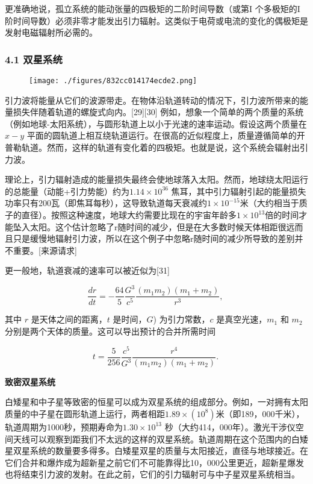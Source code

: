 更准确地说，孤立系统的能动张量的四极矩的二阶时间导数（或第I 个多极矩的I 阶时间导数）必须非零才能发出引力辐射。这类似于电荷或电流的变化的偶极矩是发射电磁辐射所必需的。

\subsubsection{4.1 双星系统}

\begin{figure}[ht]
\centering
\texttt{[image: ./figures/832cc014174ecde2.png]}
\caption\label{fig_YLB_6}
\end{figure}

引力波将能量从它们的波源带走。在物体沿轨道转动的情况下，引力波所带来的能量损失伴随着轨道的螺旋式向内。[29][30] 例如，想象一个简单的两个质量的系统（例如地球-太阳系统），与圆形轨道上以小于光速的速率运动。假设这两个质量在 $x-y$ 平面的圆轨道上相互绕轨道运行。在很高的近似程度上，质量遵循简单的开普勒轨道。然而，这样的轨道有变化着的四极矩。也就是说，这个系统会辐射出引力波。

理论上，引力辐射造成的能量损失最终会使地球落入太阳。然而，地球绕太阳运行的总能量（动能+引力势能）约为$ 1.14\times10^{36}$ 焦耳，其中引力辐射引起的能量损失功率只有200瓦（即焦耳每秒），这导致轨道每天衰减约$ 1\times10^{-15}$米（大约相当于质子的直径）。按照这种速度，地球大约需要比现在的宇宙年龄多$ 1\times10^{13}$倍的时间才能坠入太阳。这个估计忽略了r随时间的减少，但是在大多数时候天体相距很远而且只是缓慢地辐射引力波，所以在这个例子中忽略r随时间的减少所导致的差别并不重要。[来源请求]

更一般地，轨道衰减的速率可以被近似为[31]

\begin{equation}
\frac{dr}{dt} = -\frac{64}{5} \frac{G^3}{c^5} \frac{(m_1 m_2)(m_1 + m_2)}{r^3},~
\end{equation}

其中 $r$ 是天体之间的距离，$t$ 是时间，$G$) 为引力常数，$c$ 是真空光速，$m_1$ 和 $m_2$ 分别是两个天体的质量。这可以导出预计的合并所需时间

\begin{equation}
t = \frac{5}{256} \frac{c^5}{G^3} \frac{r^4}{(m_1 m_2)(m_1 + m_2)}
.~
\end{equation}

\textbf{致密双星系统}

白矮星和中子星等致密的恒星可以成为双星系统的组成部分。例如，一对拥有太阳质量的中子星在圆形轨道上运行，两者相距$ 1.89\times(10^8)$米（即189，000千米），轨道周期为1000秒，预期寿命为$ 1.30\times10^{13}$ 秒（大约414，000年）。激光干涉仪空间天线可以观察到距我们不太远的这样的双星系统。轨道周期在这个范围内的白矮星双星系统的数量要多得多。白矮星双星的质量与太阳接近，直径与地球接近。在它们合并和爆炸成为超新星之前它们不可能靠得比10，000公里更近，超新星爆发也将结束引力波的发射。在此之前，它们的引力辐射可与中子星双星系统相当。

